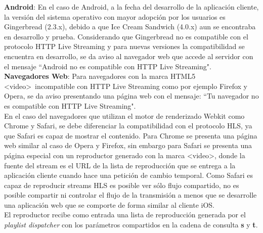 \textbf{Android}: En el caso de Android, a la fecha del desarrollo de la aplicación cliente, la versión del sistema operativo con mayor adopción por los usuarios es Gingerbread (2.3.x), debido a que Ice Cream Sandwich (4.0.x) aun se encontraba en desarrollo y prueba. Considerando que Gingerbread no es compatible con el protocolo HTTP Live Streaming y para nuevas versiones la compatibilidad se encuentra en desarrollo, se da aviso al navegador web que accede al servidor con el mensaje \textquotedblleft Android no es compatible con HTTP Live Streaming".\\

\textbf{Navegadores Web}:
Para navegadores con la marca HTML5 \textless video\textgreater \ incompatible con HTTP Live Streaming como por ejemplo Firefox y Opera, se da aviso presentando una página web con el mensaje: \textquotedblleft Tu navegador no es compatible con HTTP Live Streaming". \\

En el caso del navegadores que utilizan el motor de renderizado Webkit como Chrome y Safari, se debe diferenciar la compatibilidad con el protocolo HLS, ya que Safari es capaz de mostrar el contenido. Para Chrome se presenta una página web similar al caso de Opera y Firefox, sin embargo para Safari se presenta una página especial con un reproductor generado con la marca \textless video\textgreater , donde la fuente del stream es el URL de la lista de reproducción que se entrega a la aplicación cliente cuando hace una petición de cambio temporal. Como Safari es capaz de reproducir streams HLS es posible ver sólo flujo compartido, no es posible compartir ni controlar el flujo de la transmisión a menos que se desarrolle una aplicación web que se comporte de forma similar al cliente iOS.\\

El reproductor recibe como entrada una lista de reproducción generada por el \textit{playlist dispatcher} con los parámetros compartidos en la cadena de consulta \textbf{s} y \textbf{t}.



		
		